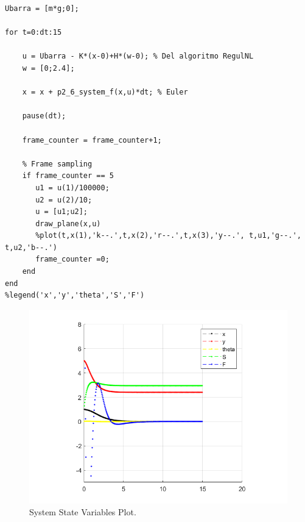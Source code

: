 \documentclass{article}
\begin{document}
\begin{itemize}
\begin{tcolorbox}
\begin{scriptsize}
\begin{verbatim}
Ubarra = [m*g;0];

for t=0:dt:15

    u = Ubarra - K*(x-0)+H*(w-0); % Del algoritmo RegulNL
    w = [0;2.4];

    x = x + p2_6_system_f(x,u)*dt; % Euler
    
    pause(dt);
    
    frame_counter = frame_counter+1;
    
    % Frame sampling
    if frame_counter == 5
       u1 = u(1)/100000;
       u2 = u(2)/10;
       u = [u1;u2];
       draw_plane(x,u)
       %plot(t,x(1),'k--.',t,x(2),'r--.',t,x(3),'y--.', t,u1,'g--.', t,u2,'b--.')
       frame_counter =0;
    end
end
%legend('x','y','theta','S','F')

\end{verbatim}
\end{scriptsize}
\end{tcolorbox}

\bigskip
\begin{figure}[H]
\centerline{\includegraphics[scale=0.65]{figures/p2_6graphic}}
\caption{System State Variables Plot.}
\label{fig:figure2}
\end{figure}


\end{itemize}
\end{document}
